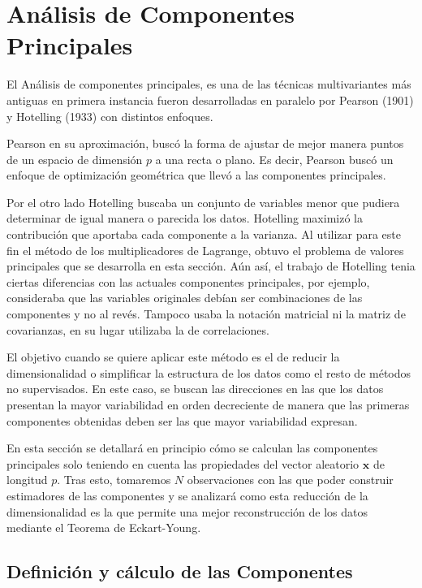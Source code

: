 \newpage
\section{Análisis de Componentes Principales}
\noindent El Análisis de componentes principales, es una de las técnicas multivariantes más antiguas en primera instancia fueron desarrolladas en paralelo por Pearson (1901) y Hotelling (1933) \cite{Jollife 1986} con distintos enfoques. 

\noindent Pearson en su aproximación, buscó la forma de ajustar de mejor manera puntos de un espacio de dimensión $p$ a una recta o plano. Es decir, Pearson buscó un enfoque de optimización geométrica que llevó a las componentes principales.

\noindent Por el otro lado Hotelling buscaba un conjunto de variables menor que pudiera determinar de igual manera o parecida los datos. Hotelling maximizó la contribución que aportaba cada componente a la varianza. Al utilizar para este fin el método de los multiplicadores de Lagrange, obtuvo el problema de valores principales que se desarrolla en esta sección. Aún así, el trabajo de Hotelling tenia ciertas diferencias con las actuales componentes principales, por ejemplo, consideraba que las variables originales  debían ser combinaciones de las componentes y no al revés. Tampoco usaba la notación matricial ni la matriz de covarianzas, en su lugar utilizaba la de correlaciones. 

\noindent El objetivo cuando se quiere aplicar este método es el de reducir la dimensionalidad o simplificar la estructura de los datos como el resto de métodos no supervisados. En este caso, se buscan las direcciones en las que los datos presentan la mayor variabilidad en orden decreciente de manera que las primeras componentes obtenidas deben ser las que mayor variabilidad expresan. 

\noindent En esta sección se detallará en principio cómo se calculan las componentes principales solo teniendo en cuenta las propiedades del vector aleatorio $\mathbf{x}$ de longitud $p$. Tras esto, tomaremos $N$ observaciones con las que poder construir estimadores de las componentes y se analizará como esta reducción de la dimensionalidad es la que permite una mejor reconstrucción de los datos mediante el Teorema de Eckart-Young. 

\subsection{Definición y cálculo de las Componentes}

